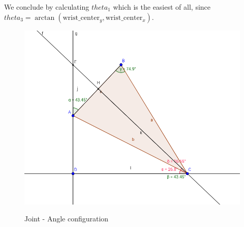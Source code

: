 \documentclass[a4paper,11pt]{article}
\begin{document}
We conclude by calculating $theta_1$ which is the easiest of all, since $ theta_3 =\arctan(\text{wrist\_center}_y,\text{wrist\_center}_x)$.
\begin{figure}[hbt!]
	\caption{Joint - Angle configuration}
	\includegraphics[scale=0.8]{geogebra_joints.png}
	\label{fig:angles}
\end{figure}
\end{document}
